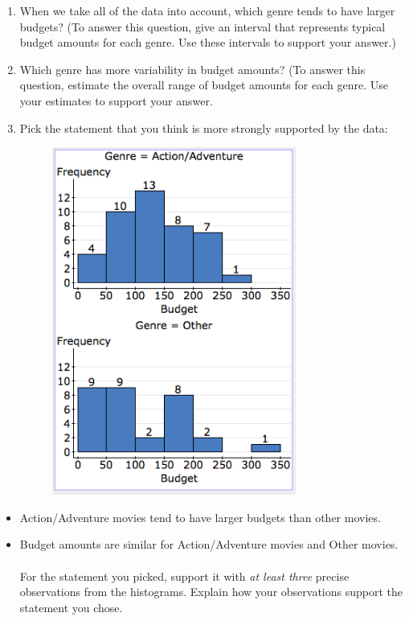 \begin{enumerate}
\begin{enumerate}
\item When we take all of the data into account, which genre tends to have
larger budgets? (To answer this question, give an interval that represents
typical budget amounts for each genre. Use these intervals to support
your answer.)\newpage{}
\item Which genre has more variability in budget amounts? (To answer this
question, estimate the overall range of budget amounts for each genre.
Use your estimates to support your answer.\vspace{0.7in}

\item Pick the statement that you think is more strongly supported by the
data:\\
\begin{figure}[H]
\noindent \begin{centering}
\includegraphics[height=4.5in]{./img/image2}
\par\end{centering}

\end{figure}
\end{enumerate}
\begin{itemize}
\item Action/Adventure movies tend to have larger budgets than other movies.
\item Budget amounts are similar for Action/Adventure movies and Other movies.\\
\\
For the statement you picked, support it with \emph{at least three}
precise observations from the histograms. Explain how your observations
support the statement you chose.\end{itemize}
\end{enumerate}
\clearpage


